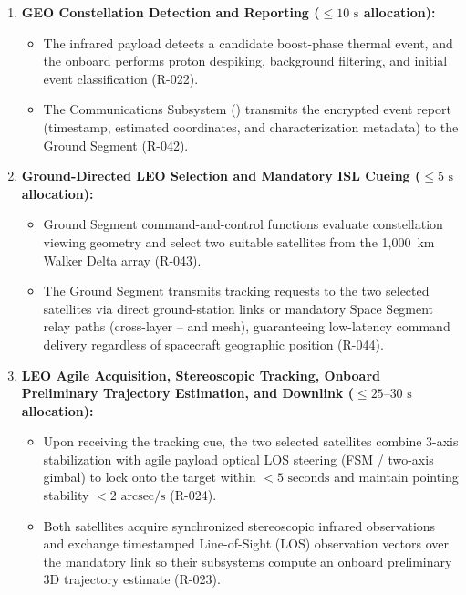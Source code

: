 \begin{enumerate}
    \item \textbf{GEO Constellation Detection and Reporting ($\le 10\text{ s}$ allocation):}
    \begin{itemize}
        \item The  infrared payload detects a candidate boost-phase thermal event, and the onboard  performs proton despiking, background filtering, and initial event classification (R-022).
        \item The  Communications Subsystem () transmits the encrypted event report (timestamp, estimated coordinates, and characterization metadata) to the Ground Segment (R-042).
    \end{itemize}
    \item \textbf{Ground-Directed LEO Selection and Mandatory ISL Cueing ($\le 5\text{ s}$ allocation):}
    \begin{itemize}
        \item Ground Segment command-and-control functions evaluate constellation viewing geometry and select two suitable  satellites from the 1,000~km Walker Delta array (R-043).
        \item The Ground Segment transmits tracking requests to the two selected  satellites via direct ground-station links or mandatory Space Segment  relay paths (cross-layer -- and   mesh), guaranteeing low-latency command delivery regardless of spacecraft geographic position (R-044).
    \end{itemize}
    \item \textbf{LEO Agile Acquisition, Stereoscopic Tracking, Onboard Preliminary Trajectory Estimation, and Downlink ($\le 25\text{--}30\text{ s}$ allocation):}
    \begin{itemize}
        \item Upon receiving the tracking cue, the two selected  satellites combine 3-axis  stabilization with agile payload optical LOS steering (FSM / two-axis gimbal) to lock onto the target within $< 5\text{ seconds}$ and maintain pointing stability $< 2\text{ arcsec/s}$ (R-024).
        \item Both  satellites acquire synchronized stereoscopic infrared observations and exchange timestamped Line-of-Sight (LOS) observation vectors over the mandatory  link so their  subsystems compute an onboard preliminary 3D trajectory estimate (R-023).

\end{itemize}
\end{enumerate}
